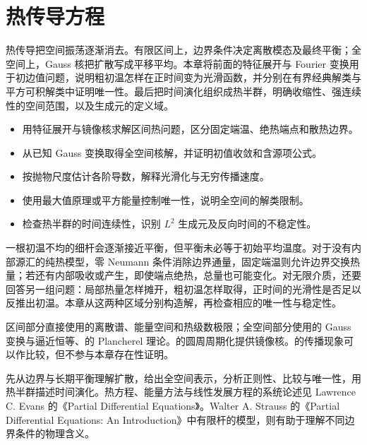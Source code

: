 \chapter{热传导方程}
\label{b2:ch:12}
\begin{chapterabstract}
热传导把空间振荡逐渐消去。有限区间上，边界条件决定离散模态及最终平衡；全空间上，Gauss 核把扩散写成平移平均。本章将前面的特征展开与 Fourier 变换用于初边值问题，说明粗初温怎样在正时间变为光滑函数，并分别在有界经典解类与平方可积解类中证明唯一性。最后把时间演化组织成热半群，明确收缩性、强连续性的空间范围，以及生成元的定义域。
\end{chapterabstract}

\begin{learninggoals}
\begin{itemize}
\item\label{b2:item:12-goal-boundary}用特征展开与镜像核求解区间热问题，区分固定端温、绝热端点和散热边界。
\item\label{b2:item:12-goal-kernel}从已知 Gauss 变换取得全空间核解，并证明初值收敛和含源项公式。
\item\label{b2:item:12-goal-smooth}按抛物尺度估计各阶导数，解释光滑化与无穷传播速度。
\item\label{b2:item:12-goal-unique}使用最大值原理或平方能量控制唯一性，说明全空间的解类限制。
\item\label{b2:item:12-goal-semigroup}检查热半群的时间连续性，识别 \(L^2\) 生成元及反向时间的不稳定性。
\end{itemize}
\end{learninggoals}

一根初温不均的细杆会逐渐接近平衡，但平衡未必等于初始平均温度。对于没有内部源汇的纯热模型，零 Neumann 条件消除边界通量，固定端温则允许边界交换热量；若还有内部吸收或产生，即使端点绝热，总量也可能变化。对无限介质，还要回答另一组问题：局部热量怎样摊开，粗初温怎样取得，正时间的光滑性是否足以反推出初温。本章从这两种区域分别构造解，再检查相应的唯一性与稳定性。

\ProseParagraphBreak

区间部分直接使用的离散谱、能量空间和热级数极限；全空间部分使用的 Gauss 变换与逼近恒等、的 Plancherel 理论。的圆周周期化提供镜像核。的传播现象可以作比较，但不参与本章存在性证明。

\ProseParagraphBreak

先从边界与长期平衡理解扩散，给出全空间表示，分析正则性、比较与唯一性，用热半群描述时间演化。热方程、能量方法与线性发展方程的系统论述见 Lawrence C. Evans 的《Partial Differential Equations》\cite{Evans2010Partial}。Walter A. Strauss 的《Partial Differential Equations: An Introduction》\cite{Strauss2008Partial}中有限杆的模型，则有助于理解不同边界条件的物理含义。


